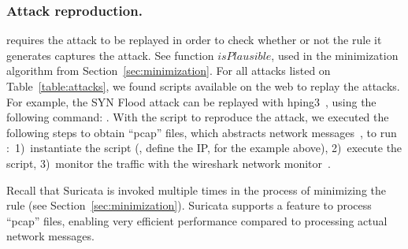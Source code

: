 \documentclass[sigconf,review, anonymous]{acmart}
\begin{document}
\subsubsection{Attack reproduction.} \tname{} requires the attack to
be replayed in order to check whether or not the rule it generates
captures the attack.  See function $\mathit{isPlausible}$, used in the
minimization algorithm from Section~\ref{sec:minimization}. For all
attacks listed on Table~\ref{table:attacks}, we found scripts
available on the web to replay the attacks. For example, the SYN Flood
attack can be replayed with hping3~\cite{hping3}, using the following
command: . With the script to reproduce the attack, we executed the
following steps to obtain ``pcap'' files, which abstracts network
messages~\cite{pcap}, to run \tname:~1)~instantiate the script (\eg{},
define the IP, for the example above), 2)~execute the script,
3)~monitor the traffic with the wireshark network
monitor~\cite{wireshark-net-monitor}.

Recall that Suricata is invoked multiple times in the process of
minimizing the rule (see Section~\ref{sec:minimization}). Suricata
supports a feature to process ``pcap'' files, enabling very efficient
performance compared to processing actual network messages.
  
\end{document}
